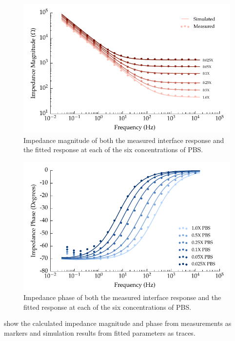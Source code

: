       \begin{figure}
        \centering
        \includegraphics{content/pt2/08-InterfaceParameters/graphics/displacement_impedanceVsFrequency_magnitude_thesis}
        \caption{\label{fig:pt2-graph_impedanceVsFrequency_magnitude}Impedance magnitude of both the measured interface response and the fitted response at each of the six concentrations of PBS.}
      \end{figure}
      \begin{figure}
        \centering
        \includegraphics{content/pt2/08-InterfaceParameters/graphics/displacement_impedanceVsFrequency_phase_thesis}
        \caption{\label{fig:pt2-graph_impedanceVsFrequency_phase}Impedance phase of both the measured interface response and the fitted response at each of the six concentrations of PBS.}
      \end{figure}
       show the calculated impedance magnitude and phase from measurements as markers and simulation results from fitted parameters as traces.
